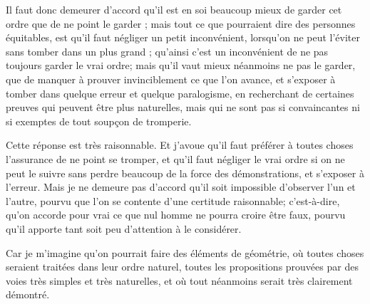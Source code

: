 Il faut donc demeurer d'accord qu'il est en soi beaucoup mieux de garder cet ordre que de ne point le garder ; mais tout ce que pourraient dire des personnes équitables, est qu'il faut négliger un petit inconvénient, lorsqu'on ne peut l'éviter sans tomber dans un plus grand ; qu'ainsi c'est un inconvénient de ne pas toujours garder le vrai ordre; mais qu'il vaut mieux néanmoins ne pas le garder, que de manquer à prouver invinciblement ce que l'on avance, et s'exposer à tomber dans quelque erreur et quelque paralogisme, en recherchant de certaines preuves qui peuvent être plus naturelles, mais qui ne sont pas si convaincantes ni si exemptes de tout soupçon de tromperie.

Cette réponse est très raisonnable. Et j'avoue qu'il faut préférer à toutes choses l'assurance de ne point se tromper, et qu'il faut négliger le vrai ordre si on ne peut le suivre sans perdre beaucoup de la force des démonstrations, et s'exposer à l'erreur. Mais je ne demeure pas d'accord qu'il soit impossible d'observer l'un et l'autre, pourvu que l'on se contente d'une certitude raisonnable; c'est-à-dire, qu'on accorde pour vrai ce que nul homme ne pourra croire être faux, pourvu qu'il apporte tant soit peu d'attention à le considérer.

Car je m'imagine qu'on pourrait faire des éléments de géométrie, où toutes choses seraient traitées dans leur ordre naturel, toutes les propositions prouvées par des voies très simples et très naturelles, et où tout néanmoins serait très clairement démontré.
